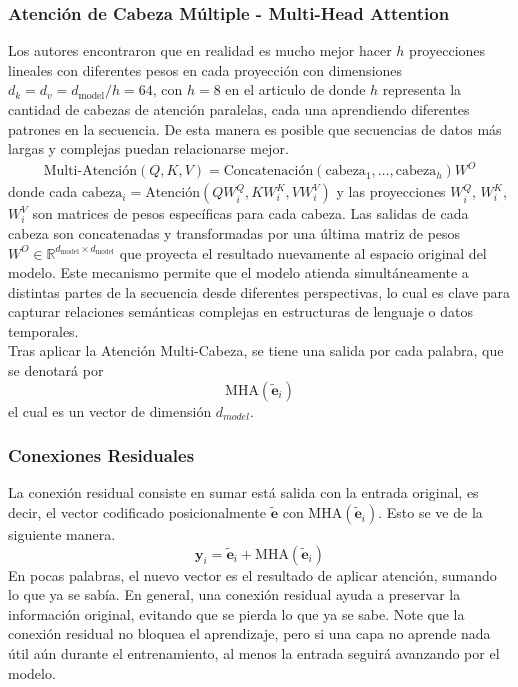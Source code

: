 \documentclass[12pt,letterpaper]{article}
\begin{document}
\subsubsection{Atención de Cabeza Múltiple - Multi-Head Attention }
Los autores \cite{vaswani2017attention} encontraron que en realidad es mucho mejor hacer $h$ proyecciones lineales con diferentes pesos en cada proyección con dimensiones $d_k = d_v = d_{\text{model}}/h=64$, con $h=8$ en el articulo de \cite{vaswani2017attention} donde $h$ representa la cantidad de cabezas de atención paralelas, cada una aprendiendo diferentes patrones en la secuencia. De esta manera es posible que secuencias de datos más largas y complejas puedan relacionarse mejor.
\begin{gather}
    \text{Multi-Atención}(Q, K, V) = \text{Concatenación}(\text{cabeza}_1, \dots, \text{cabeza}_h)W^{O}
\end{gather}
donde cada $\text{cabeza}_i = \text{Atención}(QW_i^Q, KW_i^K, VW_i^V)$ y las proyecciones $W_i^Q$, $W_i^K$, $W_i^V$ son matrices de pesos específicas para cada cabeza. Las salidas de cada cabeza son concatenadas y transformadas por una última matriz de pesos $W^O \in \mathbb{R}^{d_{\text{model}} \times d_{\text{model}}}$ que proyecta el resultado nuevamente al espacio original del modelo. Este mecanismo permite que el modelo atienda simultáneamente a distintas partes de la secuencia desde diferentes perspectivas, lo cual es clave para capturar relaciones semánticas complejas en estructuras de lenguaje o datos temporales.\\

Tras aplicar la Atención Multi-Cabeza, se tiene una salida por cada palabra, que se denotará por
\[
\text{MHA}(\tilde{\textbf{e}}_i)
\]
el cual es un vector de dimensión $d_{model}$.

\subsubsection{Conexiones Residuales}
La conexión residual consiste en sumar está salida con la entrada original, es decir, el vector codificado posicionalmente $\tilde{\textbf{e}}$ con $\text{MHA}(\tilde{\textbf{e}}_i)$. Esto se ve de la siguiente manera.
\begin{equation}
    \textbf{y}_i = \tilde{\textbf{e}}_i + \text{MHA}(\tilde{\textbf{e}}_i)
\end{equation}
En pocas palabras, el nuevo vector es el resultado de aplicar atención, sumando lo que ya se sabía. En general, una conexión residual ayuda a preservar la información original, evitando que se pierda lo que ya se sabe. Note que la conexión residual no bloquea el aprendizaje, pero si una capa no aprende nada útil aún durante el entrenamiento, al menos la entrada seguirá avanzando por el modelo. 
\end{document}
